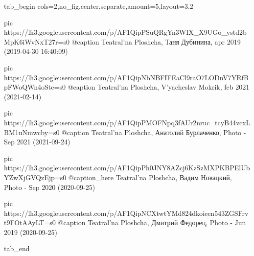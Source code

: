  
 
 
 
 

\ifcmt
  tab_begin cols=2,no_fig,center,separate,amount=5,layout=3.2

     pic https://lh3.googleusercontent.com/p/AF1QipPSuQRgYn3WIX_X9UGo_ystd2bMpK6iWvNxT27r=s0
		 @caption Teatral'na Ploshcha, Таня Дубинина, apr 2019 (2019-04-30 16:40:09)
		 
		 pic https://lh3.googleusercontent.com/p/AF1QipNbNBFIFEaCl9raO7LODnV7YRfBpFWoQWn4oStc=s0
		 @caption Teatral'na Ploshcha, V'yacheslav Mokrik, feb 2021 (2021-02-14)

		 pic https://lh3.googleusercontent.com/p/AF1QipPMOFNpq3fAUr2nruc_tcyB44vcxLBM1uNmwcby=s0
		 @caption Teatral'na Ploshcha, Анатолий Бурлаченко, Photo - Sep 2021 (2021-09-24)

		 pic https://lh3.googleusercontent.com/p/AF1QipPh0JNY8AZcj6KzSzMXPKBPElUbYZwXjGVQzEjp=s0
		 @caption_here Teatral'na Ploshcha, Вадим Новацкий, Photo - Sep 2020 (2020-09-25)

		 pic https://lh3.googleusercontent.com/p/AF1QipNCXtwtYMd824dkoieen543ZGSFrvt9FOtAAyLT=s0
		 @caption Teatral'na Ploshcha, Дмитрий Федорец, Photo - Jun 2019 (2020-09-25)

  tab_end
\fi
